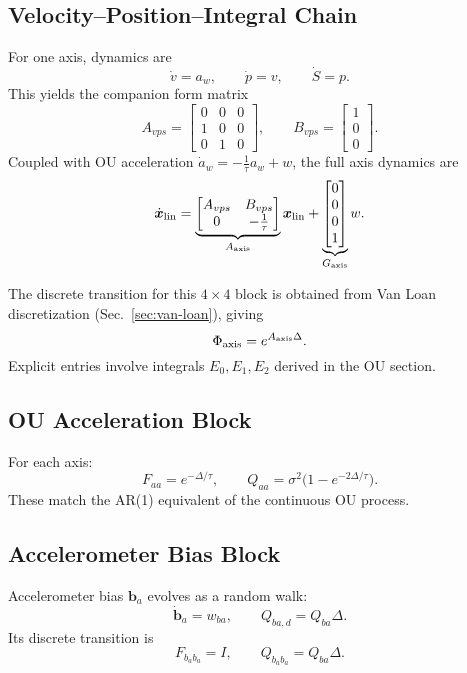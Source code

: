 \documentclass[10pt]{extarticle}
\begin{document}
\subsection{Velocity–Position–Integral Chain}
For one axis, dynamics are
\[
\dot v = a_w,\qquad
\dot p = v,\qquad
\dot S = p.
\]
This yields the companion form matrix
\begin{equation}
A_{vps} =
\begin{bmatrix}
0 & 0 & 0\\
1 & 0 & 0\\
0 & 1 & 0
\end{bmatrix},\qquad
B_{vps} = \begin{bmatrix}1\\0\\0\end{bmatrix}.
\label{eq:Avps}
\end{equation}
Coupled with OU acceleration $\dot a_w = -\tfrac{1}{\tau}a_w + w$, the full
axis dynamics are
\[
\dot{\bm x}_{\rm lin} = 
\underbrace{\begin{bmatrix}
A_{vps} & B_{vps}\\
0 & -\tfrac{1}{\tau}
\end{bmatrix}}_{A_{\rm axis}}
\bm x_{\rm lin} + 
\underbrace{\begin{bmatrix}0\\0\\0\\1\end{bmatrix}}_{G_{\rm axis}}w.
\]

The discrete transition for this $4\times 4$ block is obtained from
Van Loan discretization (Sec.~\ref{sec:van-loan}), giving
\begin{equation}
\Phi_{\rm axis} = e^{A_{\rm axis}\Delta}.
\label{eq:phi-axis}
\end{equation}
Explicit entries involve integrals $E_0,E_1,E_2$ derived in the OU section.

\subsection{OU Acceleration Block}
For each axis:
\begin{equation}
F_{aa} = e^{-\Delta/\tau},\qquad
Q_{aa} = \sigma^2 \big(1-e^{-2\Delta/\tau}\big).
\label{eq:ou-discrete}
\end{equation}
These match the AR(1) equivalent of the continuous OU process.

\subsection{Accelerometer Bias Block}
Accelerometer bias $\bm b_a$ evolves as a random walk:
\begin{equation}
\dot{\bm b}_a = w_{ba},\qquad
Q_{ba,d} = Q_{ba}\Delta.
\label{eq:accel-bias-rw}
\end{equation}
Its discrete transition is
\[
F_{b_ab_a} = I,\qquad
Q_{b_ab_a} = Q_{ba}\Delta.
\]
\end{document}
